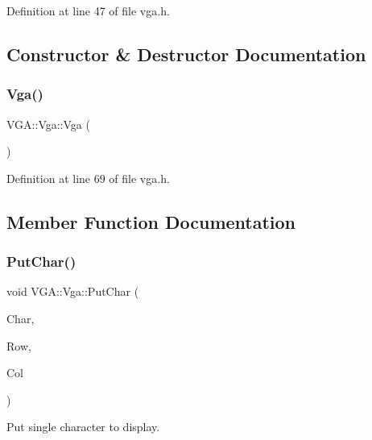 Definition at line 47 of file vga.\+h.



\subsection{Constructor \& Destructor Documentation}
\mbox{\label{class_v_g_a_1_1_vga_a40f0b5de5a1687eca3c47738d8232bc7}} 
\subsubsection{\texorpdfstring{Vga()}{Vga()}}
{\footnotesize\ttfamily V\+G\+A\+::\+Vga\+::\+Vga (\begin{DoxyParamCaption}{ }\end{DoxyParamCaption})\hspace{0.3cm}{\ttfamily [inline]}}



Definition at line 69 of file vga.\+h.



\subsection{Member Function Documentation}
\mbox{\label{class_v_g_a_1_1_vga_a29fa008c7c3c71535e0502063451bea7}} 
\subsubsection{\texorpdfstring{Put\+Char()}{PutChar()}}
{\footnotesize\ttfamily void V\+G\+A\+::\+Vga\+::\+Put\+Char (\begin{DoxyParamCaption}\item[{\hyperlink{namespace_v_g_a_adb876ce4a116e09f39708ca16ef25f74}{Vga\+Char}}]{Char,  }\item[{size\+\_\+t}]{Row,  }\item[{size\+\_\+t}]{Col }\end{DoxyParamCaption})\hspace{0.3cm}{\ttfamily [inline]}}



Put single character to display. 


